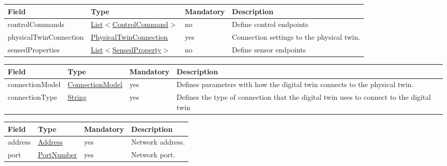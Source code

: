 \documentclass[a4paper]{arrowhead}
\newcommand{\pref}[1]{{\textcolor{ArrowheadGrey}{\hyperref[sec:model:primitives:#1]{#1}}}}
\begin{document}
\label{sec:model:DigitalTwinRequest}
 
\begin{table}[H]
\begin{tabularx}{\textwidth}{| p{4cm} | p{4cm} | p{2cm} | X |} \hline
\rowcolor{gray!33} Field & Type & Mandatory & Description \\ \hline
controlCommands & \pref{List}$<$\hyperref[sec:model:ControlCommand]{ControlCommand}$>$ & no & Define control endpoints \\ \hline
physicalTwinConnection & \hyperref[sec:model:PhysicalTwinConnection]{PhysicalTwinConnection} & yes & Connection settings to the physical twin. \\ \hline
sensedProperties & \pref{List}$<$\hyperref[sec:model:SensedProperty]{SensedProperty}$>$ & no & Define sensor endpoints \\ \hline
\end{tabularx}
\end{table}

\label{sec:model:PhysicalTwinConnection}
 
\begin{table}[H]
\begin{tabularx}{\textwidth}{| p{4.25cm} | p{3.5cm} | p{2cm} | X |} \hline
\rowcolor{gray!33} Field & Type & Mandatory & Description \\ \hline
connectionModel & \pref{ConnectionModel} & yes & Defines parameters with how the digital twin connects to the physical twin. \\ \hline
connectionType & \pref{String} & yes & Defines the type of connection that the digital twin uses to connect to the digital twin \\ \hline
\end{tabularx}
\end{table}

\label{sec:model:ConnectionModel}
 
\begin{table}[H]
\begin{tabularx}{\textwidth}{| p{4.25cm} | p{3.5cm} | p{2cm} | X |} \hline
\rowcolor{gray!33} Field & Type & Mandatory & Description \\ \hline
address & \pref{Address} & yes & Network address. \\ \hline
port & \pref{PortNumber} & yes & Network port. \\ \hline
\end{tabularx}
\end{table}
\end{document}
